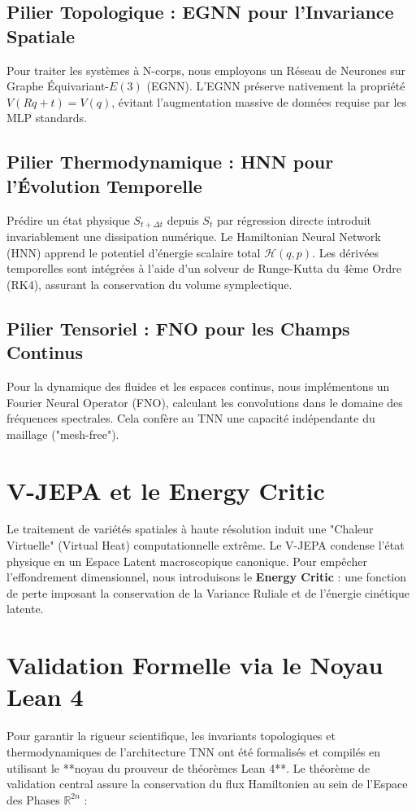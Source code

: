 \documentclass[11pt,a4paper]{article}
\begin{document}
\subsection{Pilier Topologique : EGNN pour l'Invariance Spatiale}
Pour traiter les systèmes à N-corps, nous employons un Réseau de Neurones sur Graphe Équivariant-$E(3)$ (EGNN). L'EGNN préserve nativement la propriété $V(R q + t) = V(q)$, évitant l'augmentation massive de données requise par les MLP standards.

\subsection{Pilier Thermodynamique : HNN pour l'Évolution Temporelle}
Prédire un état physique $S_{t+\Delta t}$ depuis $S_t$ par régression directe introduit invariablement une dissipation numérique. Le Hamiltonian Neural Network (HNN) apprend le potentiel d'énergie scalaire total $\mathcal{H}(q,p)$. Les dérivées temporelles sont intégrées à l'aide d'un solveur de Runge-Kutta du 4ème Ordre (RK4), assurant la conservation du volume symplectique.

\subsection{Pilier Tensoriel : FNO pour les Champs Continus}
Pour la dynamique des fluides et les espaces continus, nous implémentons un Fourier Neural Operator (FNO), calculant les convolutions dans le domaine des fréquences spectrales. Cela confère au TNN une capacité indépendante du maillage ("mesh-free").

\section{V-JEPA et le Energy Critic}
Le traitement de variétés spatiales à haute résolution induit une "Chaleur Virtuelle" (Virtual Heat) computationnelle extrême. Le V-JEPA condense l'état physique en un Espace Latent macroscopique canonique. 
Pour empêcher l'effondrement dimensionnel, nous introduisons le \textbf{Energy Critic} : une fonction de perte imposant la conservation de la Variance Ruliale et de l'énergie cinétique latente.

\section{Validation Formelle via le Noyau Lean 4}
Pour garantir la rigueur scientifique, les invariants topologiques et thermodynamiques de l'architecture TNN ont été formalisés et compilés en utilisant le **noyau du prouveur de théorèmes Lean 4**. Le théorème de validation central assure la conservation du flux Hamiltonien au sein de l'Espace des Phases $\mathbb{R}^{2n}$ :
\end{document}
